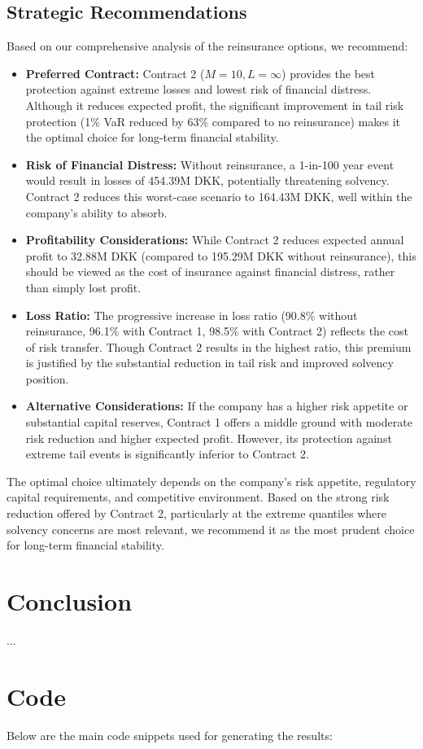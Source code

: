 \documentclass[8pt]{article}
\begin{document}
\subsection{Strategic Recommendations}

Based on our comprehensive analysis of the reinsurance options, we recommend:

\begin{itemize}
    \item \textbf{Preferred Contract:} Contract 2 ($M=10, L=\infty$) provides the best protection against extreme losses and lowest risk of financial distress. Although it reduces expected profit, the significant improvement in tail risk protection (1\% VaR reduced by 63\% compared to no reinsurance) makes it the optimal choice for long-term financial stability.
    
    \item \textbf{Risk of Financial Distress:} Without reinsurance, a 1-in-100 year event would result in losses of 454.39M DKK, potentially threatening solvency. Contract 2 reduces this worst-case scenario to 164.43M DKK, well within the company's ability to absorb.
    
    \item \textbf{Profitability Considerations:} While Contract 2 reduces expected annual profit to 32.88M DKK (compared to 195.29M DKK without reinsurance), this should be viewed as the cost of insurance against financial distress, rather than simply lost profit.

    \item \textbf{Loss Ratio:} The progressive increase in loss ratio (90.8\% without reinsurance, 96.1\% with Contract 1, 98.5\% with Contract 2) reflects the cost of risk transfer. Though Contract 2 results in the highest ratio, this premium is justified by the substantial reduction in tail risk and improved solvency position.
    
    \item \textbf{Alternative Considerations:} If the company has a higher risk appetite or substantial capital reserves, Contract 1 offers a middle ground with moderate risk reduction and higher expected profit. However, its protection against extreme tail events is significantly inferior to Contract 2.

\end{itemize}

The optimal choice ultimately depends on the company's risk appetite, regulatory capital requirements, and competitive environment. Based on the strong risk reduction offered by Contract 2, particularly at the extreme quantiles where solvency concerns are most relevant, we recommend it as the most prudent choice for long-term financial stability.

\section{Conclusion}
\label{sec:conclusion}
...

\appendix
\section{Code}

Below are the main code snippets used for generating the results:
\end{document}
